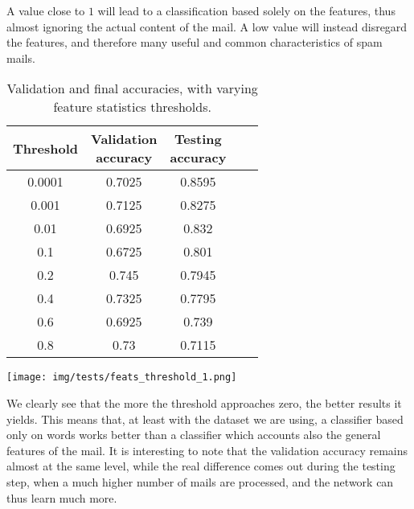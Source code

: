 A value close to $1$ will lead to a classification based solely on the features, thus almost ignoring the actual content of the mail. A low value will instead disregard the features, and therefore many useful and common characteristics of spam mails.

\begin{center}
\begin{table}[h]%
\begin{minipage}{.5\linewidth}
\begin{center}
\begin{tabular}{ccccc}
\toprule
Threshold & \shortstack{Validation\\ accuracy} & \shortstack{Testing\\ accuracy} \\
\midrule
0.0001 & 0.7025 & 0.8595 \\
0.001  & 0.7125 & 0.8275 \\
0.01   & 0.6925 & 0.832  \\
0.1    & 0.6725 & 0.801  \\
0.2    & 0.745  & 0.7945 \\
0.4    & 0.7325 & 0.7795 \\
0.6    & 0.6925 & 0.739  \\
0.8    & 0.73   & 0.7115 \\
\bottomrule
\end{tabular}
\end{center}
\end{minipage}
\begin{minipage}{.5\linewidth}
\texttt{[image: img/tests/feats\_threshold\_1.png]}
    \label{fig:featuresthreshold}
\end{minipage}
\caption{Validation and final accuracies, with varying feature statistics thresholds.}
\end{table}
\end{center}

We clearly see that the more the threshold approaches zero, the better results it yields. This means that, at least with the dataset we are using, a classifier based only on words works better than a classifier which accounts also the general features of the mail. It is interesting to note that the validation accuracy remains almost at the same level, while the real difference comes out during the testing step, when a much higher number of mails are processed, and the network can thus learn much more. 

